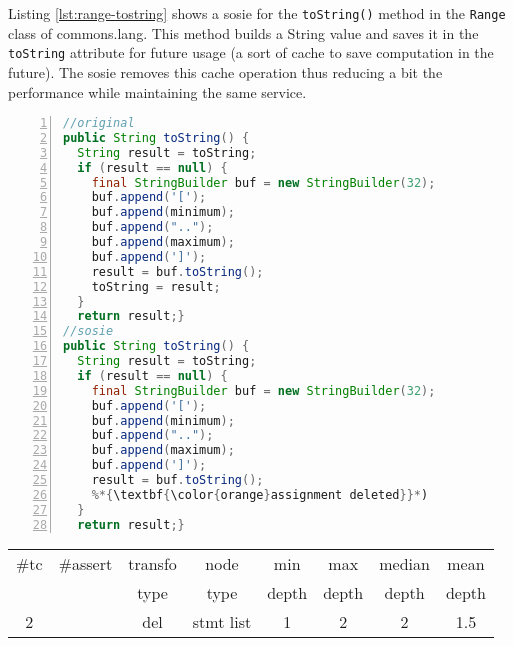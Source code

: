 Listing \ref{lst:range-tostring} shows a sosie for the \texttt{toString()} method in the \texttt{Range} class of commons.lang. 
This method builds a String value and saves it in the \texttt{toString} attribute for future usage (a sort of cache to save computation in the future). 
The sosie removes this cache operation thus reducing a bit the performance while maintaining the same service.

\begin{minipage}{\columnwidth}
\begin{lstlisting}[caption={\texttt{toString} in commons.lang and a sosie},label={lst:range-tostring},language=java,numbers=left]
//original
public String toString() {
  String result = toString;
  if (result == null) {
    final StringBuilder buf = new StringBuilder(32);
    buf.append('[');
    buf.append(minimum);
    buf.append("..");
    buf.append(maximum);
    buf.append(']');
    result = buf.toString();
    toString = result;
  }
  return result;}
//sosie
public String toString() {
  String result = toString;
  if (result == null) {
    final StringBuilder buf = new StringBuilder(32);
    buf.append('[');
    buf.append(minimum);
    buf.append("..");
    buf.append(maximum);
    buf.append(']');
    result = buf.toString();
    %*{\textbf{\color{orange}assignment deleted}}*)
  }
  return result;}
\end{lstlisting}
\tabcolsep=0.11cm
\begin{tabular}{>{\small}c>{\small}c>{\small}c>{\small}c>{\small}c>{\small}c>{\small}c>{\small}c}
\hline
\rowcolor{lightgray} \#tc & \#assert & transfo & node & min & max & median & mean   \\
\rowcolor{lightgray}  & & type & type & depth  & depth & depth & depth  \\ 
\hline
2&  & del &stmt list  &1  & 2 & 2 & 1.5\\
\hline
\end{tabular}
\end{minipage}